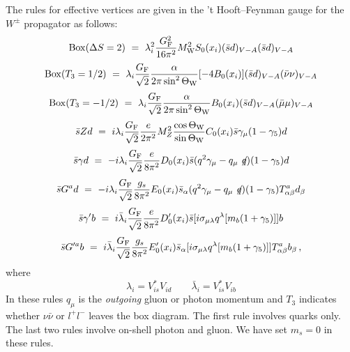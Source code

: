 \documentclass[12pt,rotate]{article}
\newcommand{\mw}{M_{\rm W}}
\newcommand{\be}{\begin{equation}}
\newcommand{\ee}{\end{equation}}
\begin{document}
\begin{itemize}
The rules for effective vertices are given  
in the 
't Hooft--Feynman gauge for the $W^\pm$ propagator as follows:
\begin{equation}\label{FR}
  {\rm Box} (\Delta S = 2)
~=~ \lambda^2_i {{G^2_{\rm F}}\over{16\pi^2}} \mw^2S_0(x_i) 
   (\bar s d)_{V-A} (\bar s d)_{V-A} 
\end{equation}
\begin{equation}\label{BT12}
 {\rm Box}(T_3= 1/2)~ =~ \lambda_i {{G_{\rm F}}\over{\sqrt 2}}
   {{\alpha}\over{2\pi \sin^2\Theta_{\rm W}}} \lbrack -4 B_0(x_i)\rbrack 
   (\bar s d)_{V-A} (\bar\nu\nu)_{V-A}
\end{equation}
\begin{equation}\label{BTM12}
{\rm Box}(T_3= -1/2)~ =~ \lambda_i {{G_{\rm F}}\over{\sqrt 2}}
   {{\alpha}\over{2\pi \sin^2\Theta_{\rm W}}} B_0(x_i) (\bar s d)_{V-A} 
   (\bar\mu\mu)_{V-A}
\end{equation}
\begin{equation}\label{ZRULE}
 \bar s Z d~ =~i \lambda_i {{G_{\rm F}}\over{\sqrt 2}} {{e}\over{2\pi^2}} 
M^2_Z
   {{\cos\Theta_{\rm W}}\over{\sin\Theta_{\rm W}}} C_0(x_i) \bar s \gamma_\mu 
   (1-\gamma_5)d
\end{equation}
\begin{equation}
 \bar s\gamma d~ =~- i\lambda_i {{G_{\rm F}}\over{\sqrt 2}} {{e}\over{8\pi^2}}
   D_0(x_i) \bar s (q^2\gamma_\mu - q_\mu \not\!q)(1-\gamma_5)d 
\end{equation}
\begin{equation}
 \bar s G^a d~ =~ -i\lambda_i{{G_{\rm F}}\over{\sqrt 
2}} {{g_s}\over{8\pi^2}}
   E_0(x_i) \bar s_{\alpha}(q^2\gamma_\mu - q_\mu \not\!q)
(1-\gamma_5)T^a_{\alpha\beta}d_\beta 
\end{equation}
\begin{equation}\label{MGP}
 \bar s \gamma' b~ =~i\bar\lambda_i {{G_{\rm F}}\over{\sqrt 2}} {{e}\over
   {8\pi^2}} D'_0(x_i) \bar s \lbrack i\sigma_{\mu\lambda} q^\lambda
   \lbrack m_b (1+\gamma_5) \rbrack\rbrack b
\end{equation}
\begin{equation}\label{FRF}
 \bar s G'^a b~ =~ 
i\bar\lambda_i{{G_{\rm F}}\over{\sqrt 2}}{{g_s}\over{8\pi^2}}
   E'_0(x_i)\bar s_{\alpha} \lbrack i\sigma_{\mu\lambda} q^\lambda
   \lbrack m_b (1+\gamma_5) \rbrack\rbrack T^a_{\alpha\beta} b_\beta \,,
\end{equation}
where 
\be
\lambda_i=V^*_{is}V_{id}\quad\quad \bar\lambda_i=V^*_{is}V_{ib}
\ee
In these rules
$q_\mu$ is the {\it outgoing} gluon or photon momentum
and $T_3$ indicates whether $\nu\bar\nu$ or $l^+l^-$
leaves the box diagram. The first rule involves quarks only.
The last two rules involve on-shell photon
and gluon.
We have set $m_s=0$ in these rules.


\end{itemize}
\end{document}
